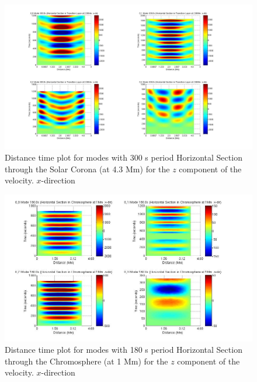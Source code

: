 \documentclass[authoryear,final,1p]{elsarticle}
\begin{document}
\begin{figure}[h]
\includegraphics[scale=0.3]{imagesn/dt_300_hor_x_2p06Mm.jpg}
\caption{Distance time plot for modes with 300 s period Horizontal Section through the Solar Corona (at 4.3 Mm) for the $z$ component of the velocity. $x$-direction}
\end{figure}


\begin{figure}[h]
\includegraphics[scale=0.45]{imagesn/dt_180_horiz_x_1Mm.jpg}
\caption{Distance time plot for modes with 180 s period Horizontal Section through the Chromosphere (at 1 Mm) for the $z$ component of the velocity. $x$-direction}
\end{figure}
\end{document}
